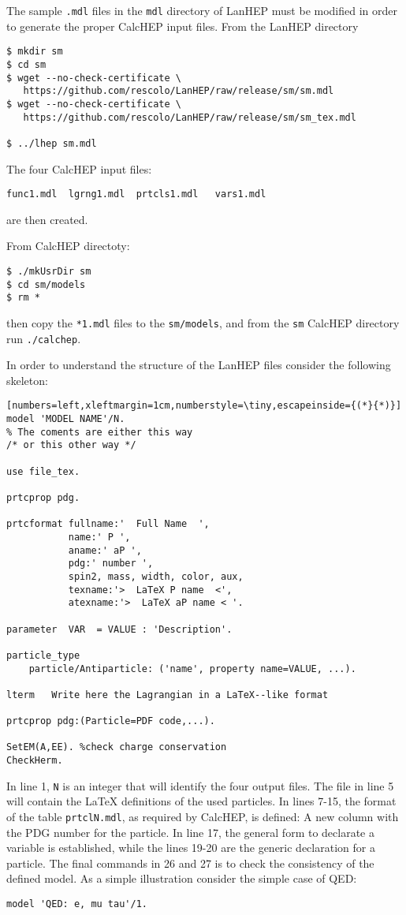 \begin{frame}{}
The sample \lstinline{.mdl} files in the \lstinline{mdl} directory of LanHEP must be modified in order to generate the proper CalcHEP input files. From the LanHEP directory
\begin{lstlisting}
$ mkdir sm
$ cd sm
$ wget --no-check-certificate \
   https://github.com/rescolo/LanHEP/raw/release/sm/sm.mdl
$ wget --no-check-certificate \
   https://github.com/rescolo/LanHEP/raw/release/sm/sm_tex.mdl

$ ../lhep sm.mdl
\end{lstlisting}
The four CalcHEP input files:
\begin{lstlisting}
func1.mdl  lgrng1.mdl  prtcls1.mdl   vars1.mdl  
\end{lstlisting}
are then created.

From CalcHEP directoty:
\begin{lstlisting}
$ ./mkUsrDir sm
$ cd sm/models
$ rm * 
\end{lstlisting}
then copy the \lstinline{*1.mdl} files to the \lstinline{sm/models}, and from the \lstinline{sm} CalcHEP directory run \lstinline{./calchep}.

In order to understand the structure of the LanHEP files consider the following skeleton:
\begin{lstlisting}[numbers=left,xleftmargin=1cm,numberstyle=\tiny,escapeinside={(*}{*)}]
model 'MODEL NAME'/N.
% The coments are either this way
/* or this other way */

use file_tex.

prtcprop pdg.

prtcformat fullname:'  Full Name  ',
           name:' P ',
           aname:' aP ',
           pdg:' number ',
           spin2, mass, width, color, aux,
           texname:'>  LaTeX P name  <',
           atexname:'>  LaTeX aP name < '.

parameter  VAR  = VALUE : 'Description'.

particle_type  
	particle/Antiparticle: ('name', property name=VALUE, ...).

lterm  	Write here the Lagrangian in a LaTeX--like format

prtcprop pdg:(Particle=PDF code,...).

SetEM(A,EE). %check charge conservation
CheckHerm.
\end{lstlisting}
In line 1, \lstinline{N} is an integer that will identify the four output files. The file in line 5 will contain the \LaTeX{} definitions of the used particles. In lines 7-15, the format of the table \lstinline{prtclN.mdl}, as required by CalcHEP, is defined: A new column with the PDG number for the particle.  In line 17, the general form to declarate a variable is established, while the lines 19-20 are the generic declaration for a particle. The final commands in 26 and 27 is to check the consistency of the defined model. 
As a simple illustration consider the simple case of QED:
\begin{lstlisting}
model 'QED: e, mu tau'/1.


\end{lstlisting}
\end{frame}
